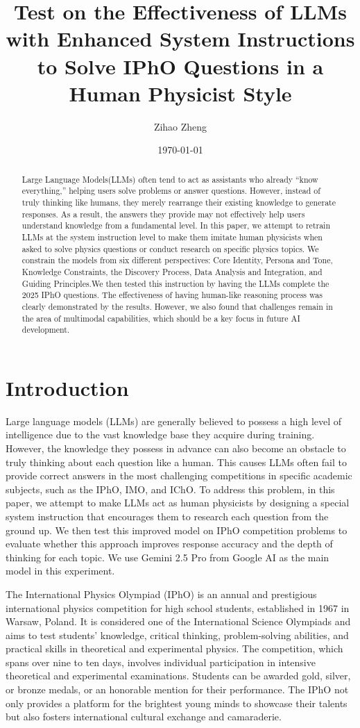 \documentclass[12pt]{article}
\title{\textbf{Test on the Effectiveness of LLMs with Enhanced System Instructions to Solve IPhO Questions in a Human Physicist Style}}
\author{Zihao Zheng}
\date{\today}
\begin{document}
\maketitle

\begin{abstract}
Large Language Models(LLMs) often tend to act as assistants who already “know everything,” helping users solve problems or answer questions. However, instead of truly thinking like humans, they merely rearrange their existing knowledge to generate responses. As a result, the answers they provide may not effectively help users understand knowledge from a fundamental level. In this paper, we attempt to retrain LLMs at the system instruction level to make them imitate human physicists when asked to solve physics questions or conduct research on specific physics topics. We constrain the models from six different perspectives: Core Identity, Persona and Tone, Knowledge Constraints, the Discovery Process, Data Analysis and Integration, and Guiding Principles.We then tested this instruction by having the LLMs complete the 2025 IPhO questions. The effectiveness of having human-like reasoning process was clearly demonstrated by the results. However, we also found that challenges remain in the area of multimodal capabilities, which should be a key focus in future AI development.
\end{abstract}
\thispagestyle{githubfooter}
\section{Introduction}

Large language models (LLMs) are generally believed to possess a high level of intelligence due to the vast knowledge base they acquire during training. However, the knowledge they possess in advance can also become an obstacle to truly thinking about each question like a human. This causes LLMs often fail to provide correct answers in the most challenging competitions in specific academic subjects, such as the IPhO, IMO, and IChO. To address this problem, in this paper, we attempt to make LLMs act as human physicists by designing a special system instruction that encourages them to research each question from the ground up. We then test this improved model on IPhO competition problems to evaluate whether this approach improves response accuracy and the depth of thinking for each topic. We use Gemini 2.5 Pro from Google AI as the main model in this experiment.

The International Physics Olympiad (IPhO) is an annual and prestigious international physics competition for high school students, established in 1967 in Warsaw, Poland. It is considered one of the International Science Olympiads and aims to test students' knowledge, critical thinking, problem-solving abilities, and practical skills in theoretical and experimental physics. The competition, which spans over nine to ten days, involves individual participation in intensive theoretical and experimental examinations. Students can be awarded gold, silver, or bronze medals, or an honorable mention for their performance. The IPhO not only provides a platform for the brightest young minds to showcase their talents but also fosters international cultural exchange and camaraderie.
\end{document}

